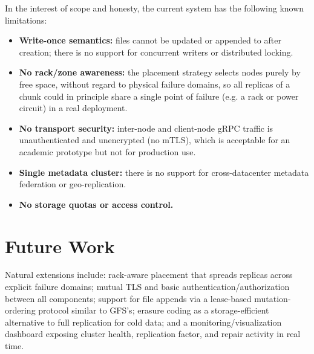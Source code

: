 \documentclass[12pt,a4paper]{report}
\begin{document}
In the interest of scope and honesty, the current system has the following known limitations:
\begin{itemize}[nosep]
    \item \textbf{Write-once semantics:} files cannot be updated or appended to after creation; there is no support for concurrent writers or distributed locking.
    \item \textbf{No rack/zone awareness:} the placement strategy selects nodes purely by free space, without regard to physical failure domains, so all replicas of a chunk could in principle share a single point of failure (e.g. a rack or power circuit) in a real deployment.
    \item \textbf{No transport security:} inter-node and client-node gRPC traffic is unauthenticated and unencrypted (no mTLS), which is acceptable for an academic prototype but not for production use.
    \item \textbf{Single metadata cluster:} there is no support for cross-datacenter metadata federation or geo-replication.
    \item \textbf{No storage quotas or access control.}
\end{itemize}

\section{Future Work}

Natural extensions include: rack-aware placement that spreads replicas across explicit failure domains; mutual TLS and basic authentication/authorization between all components; support for file appends via a lease-based mutation-ordering protocol similar to GFS's; erasure coding as a storage-efficient alternative to full replication for cold data; and a monitoring/visualization dashboard exposing cluster health, replication factor, and repair activity in real time.
\end{document}
